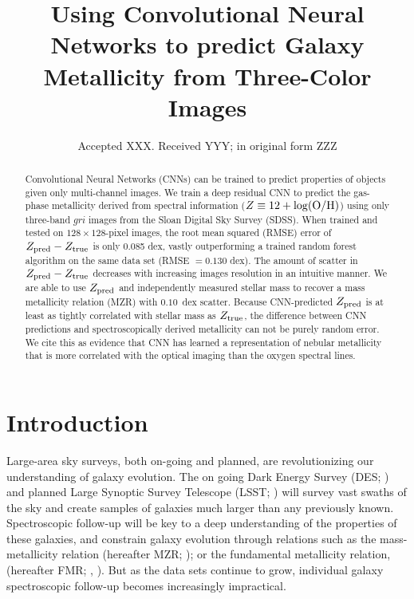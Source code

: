 \documentclass[fleqn,usenatbib]{mnras}
\title[Metallicity with CNNs]{Using Convolutional Neural Networks to predict Galaxy Metallicity from Three-Color Images}
\author[Wu and Boada]
{\parbox{\textwidth}{John~Wu$^{1}$\thanks{E-mail: \href{mailto:jw740@physics.rutgers.edu}} and
Steven~Boada$^{1}$}\vspace{0.4cm}\
\\
\parbox{\textwidth}{$^{1}$Physics and Astronomy Department, Rutgers University, Piscataway, NJ 08854-8019, USA\\}}
\date{Accepted XXX. Received YYY; in original form ZZZ}
\begin{document}
\label{firstpage}
\pagerange{\pageref{firstpage}--\pageref{lastpage}}
\maketitle

\begin{abstract}
Convolutional Neural Networks (CNNs) can be trained to predict properties of objects given only multi-channel images.
We train a deep residual CNN to predict the gas-phase metallicity derived from spectral information ($Z \equiv 12 + \log(\rm O/H)$) using only three-band $gri$ images from the Sloan Digital Sky Survey (SDSS).
When trained and tested on $128 \times 128$-pixel images, the root mean squared (RMSE) error of $Z_{\rm pred} - Z_{\rm true}$ is only 0.085 dex, vastly outperforming a trained random forest algorithm on the same data set (RMSE $=0.130$ dex).
The amount of scatter in $Z_{\rm pred} - Z_{\rm true}$ decreases with increasing images resolution in an intuitive manner.
We are able to use $Z_{\rm pred}$ and independently measured stellar mass to recover a mass metallicity relation (MZR) with $0.10$~dex scatter. 
Because CNN-predicted $Z_{\rm pred}$ is at least as tightly correlated with stellar mass as $Z_{\rm true}$, the difference between CNN predictions and spectroscopically derived metallicity can not be purely random error.
We cite this as evidence that CNN has learned a representation of nebular metallicity that is more correlated with the optical imaging than the oxygen spectral lines.
\end{abstract}

\section{Introduction}\label{sec:introduction}
Large-area sky surveys, both on-going and planned, are revolutionizing our understanding of galaxy evolution. The on going Dark Energy Survey (DES; \citealt{DES2005}) and planned Large Synoptic Survey Telescope (LSST; \citealt{LSST2012}) will survey vast swaths of the sky and create samples of galaxies much larger than any previously known. Spectroscopic follow-up will be key to a deep understanding of the properties of these galaxies, and constrain galaxy evolution through relations such as the mass-metallicity relation (hereafter MZR; \citealt{Tremonti2004}); or the fundamental metallicity relation, (hereafter FMR; \eg, \citealt{Mannucci2010}). But as the data sets continue to grow, individual galaxy spectroscopic follow-up becomes increasingly impractical.
\end{document}
